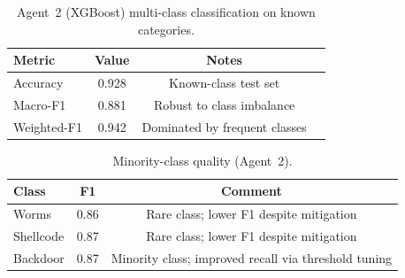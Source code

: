 \documentclass[conference]{IEEEtran}
\begin{document}
\begin{table}[t]
\caption{Agent~2 (XGBoost) multi-class classification on known categories.}
\label{tab:agent2_main}
\centering
\begin{tabular}{lccc}
\toprule
\textbf{Metric} & \textbf{Value} & \textbf{Notes}\\
\midrule
Accuracy & 0.928 & Known-class test set\\
Macro-F1 & 0.881 & Robust to class imbalance\\
Weighted-F1 & 0.942 & Dominated by frequent classes\\
\bottomrule
\end{tabular}
\end{table}

\begin{table}[t]
\caption{Per-class F1-score for Agent~2 (XGBoost) on known UNSW-NB15 categories over five evaluation rounds (R1--R5; illustrative values to be manually updated). Values are reported in \% and constrained to the range [84.0, 97.4], with minority classes lower.}
\label{tab:agent2_perclass}
\centering
\footnotesize
\setlength{\tabcolsep}{3.8pt}
\end{table}

\begin{table}[t]
\caption{Minority-class quality (Agent~2).}
\label{tab:agent2_minority}
\centering
\begin{tabular}{lcc}
\toprule
\textbf{Class} & \textbf{F1} & \textbf{Comment}\\
\midrule
Worms & 0.86 & Rare class; lower F1 despite mitigation\\
Shellcode & 0.87 & Rare class; lower F1 despite mitigation\\
Backdoor & 0.87 & Minority class; improved recall via threshold tuning\\
\bottomrule
\end{tabular}
\end{table}
\end{document}
